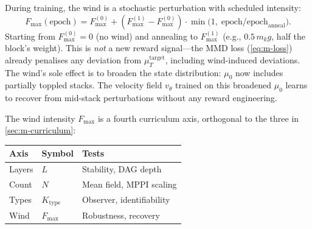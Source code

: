\begin{remark}
\label{rem:m-wind-training}
During training, the wind is a stochastic perturbation with
scheduled intensity:
\[
  F_{\max}(\text{epoch})
  = F_{\max}^{(0)}
  + (F_{\max}^{(1)} - F_{\max}^{(0)})
  \cdot \min\!\bigl(1,\;
  \text{epoch}/\text{epoch}_{\mathrm{anneal}}\bigr).
\]
Starting from $F_{\max}^{(0)} = 0$ (no wind) and annealing to
$F_{\max}^{(1)}$ (e.g., $0.5\,m_k g$, half the block's weight).
This is \emph{not} a new reward signal---the MMD loss
(\cref{eq:m-loss}) already penalises any deviation from
$\mu_T^{\mathrm{target}}$, including wind-induced deviations.
The wind's sole effect is to broaden the state distribution:
$\mu_0$ now includes partially toppled stacks.
The velocity field $v_\theta$ trained on this broadened $\mu_0$
learns to recover from mid-stack perturbations without any
reward engineering.

The wind intensity $F_{\max}$ is a fourth curriculum axis,
orthogonal to the three in \cref{sec:m-curriculum}:
\begin{center}
\begin{tabular}{@{}lll@{}}
\toprule
\textbf{Axis} & \textbf{Symbol} & \textbf{Tests} \\
\midrule
Layers & $L$ & Stability, DAG depth \\
Count & $N$ & Mean field, MPPI scaling \\
Types & $K_{\mathrm{type}}$ & Observer, identifiability \\
Wind & $F_{\max}$ & Robustness, recovery \\
\bottomrule
\end{tabular}
\end{center}
\end{remark}

